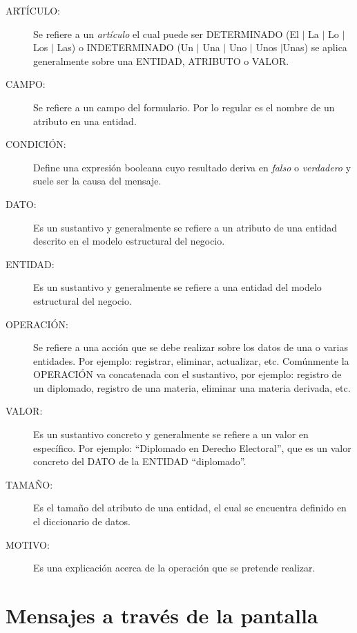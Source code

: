     \begin{description}
		\item [ARTÍCULO:] Se refiere a un {\em artículo} el cual puede ser DETERMINADO (El $\mid$ La $\mid$ Lo $\mid$ Los $\mid$ Las) o INDETERMINADO (Un $\mid$ Una $\mid$ 
	Uno $\mid$ Unos $\mid$Unas) se aplica generalmente sobre una ENTIDAD, ATRIBUTO o VALOR.
		\item [CAMPO:] Se refiere a un campo del formulario. Por lo regular es el nombre de un atributo en una entidad.
		\item [CONDICIÓN:] Define una expresión booleana cuyo resultado deriva en {\em falso} o {\em verdadero} y suele ser la causa del mensaje.
		\item [DATO:] Es un sustantivo y generalmente se refiere a un atributo de una entidad descrito en el modelo estructural del negocio.%
		\item [ENTIDAD:] Es un sustantivo y generalmente se refiere a una entidad del modelo estructural del negocio.%
		\item [OPERACIÓN:] Se refiere a una acción que se debe realizar sobre los datos de una o varias entidades. Por ejemplo: registrar, eliminar, actualizar, etc. Comúnmente la OPERACIÓN va concatenada con el sustantivo, por ejemplo: registro de un diplomado, registro de una materia, eliminar una materia derivada, etc.
		\item [VALOR:] Es un sustantivo concreto y generalmente se refiere a un valor en específico. Por ejemplo: ``Diplomado en Derecho Electoral'', que es un valor concreto del DATO de la ENTIDAD ``diplomado''.
		\item [TAMAÑO:] Es el tamaño del atributo de una entidad, el cual se encuentra definido en el diccionario de datos.
		\item [MOTIVO:] Es una explicación acerca de la operación que se pretende realizar.
	\end{description}

\section{Mensajes a través de la pantalla}


